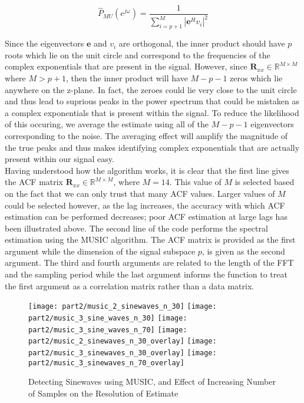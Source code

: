 \begin{equation}
\hat{P}_{MU}(e^{j\omega}) = \frac{1}{\sum_{i=p+1}^M|\textbf{e}^H v_{i}|^2}
\end{equation}

\noindent{}Since the eigenvectors $\textbf{e}$ and $v_{i}$ are orthogonal, the inner product should have $p$ roots which lie on the unit circle and correspond to the frequencies of the complex exponentials that are present in the signal. However, since $\textbf{R}_{xx} \in \mathbb{R}^{M \times M}$ where $M > p + 1$, then the inner product will have $M-p-1$ zeros which lie anywhere on the z-plane. In fact, the zeroes could lie very close to the unit circle and thus lead to suprious peaks in the power spectrum that could be mistaken as a complex exponentials that is present within the signal. To reduce the likelihood of this occuring, we average the estimate using all of the $M-p-1$ eigenvectors corresponding to the noise. The averaging effect will amplify the magnitude of the true peaks and thus makes identifying complex exponentials that are actually present within our signal easy. \\

\noindent{}Having understood how the algorithm works, it is clear that the first line gives the ACF matrix $\textbf{R}_{xx} \in \mathbb{R}^{M \times M}$, where $M=14$. This value of $M$ is selected based on the fact that we can only trust that many ACF values. Larger values of $M$ could be selected however, as the lag increases, the accuracy with which ACF estimation can be performed decreases; poor ACF estimation at large lags has been illustrated above. The second line of the code performs the spectral estimation using the MUSIC algorithm. The ACF matrix is provided as the first argument while the dimension of the signal subspace $p$, is given as the second argument. The third and fourth arguments are related to the length of the FFT and the sampling period while the last argument informs the function to treat the first argument as a correlation matrix rather than a data matrix. 

\begin{figure}[H]
\centering{}
\texttt{[image: part2/music\_2\_sinewaves\_n\_30]}
\texttt{[image: part2/music\_3\_sine\_waves\_n\_30]}
\texttt{[image: part2/music\_3\_sine\_waves\_n\_70]}
\texttt{[image: part2/music\_2\_sinewaves\_n\_30\_overlay]}
\texttt{[image: part2/music\_3\_sinewaves\_n\_30\_overlay]}
\texttt{[image: part2/music\_3\_sinewaves\_n\_70\_overlay]}
\caption{Detecting Sinewaves using MUSIC, and Effect of Increasing Number of Samples on the Resolution of Estimate}
\label{fig:music}
\end{figure}

